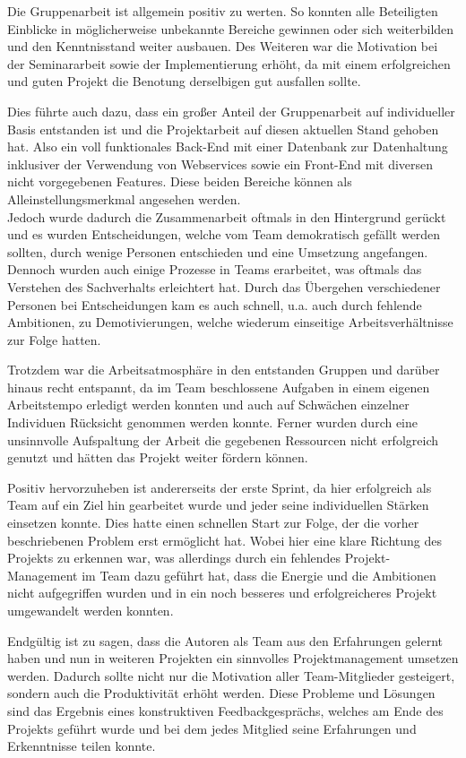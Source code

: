 Die Gruppenarbeit ist allgemein positiv zu werten. 
So konnten alle Beteiligten Einblicke in möglicherweise unbekannte Bereiche gewinnen oder sich weiterbilden und den Kenntnisstand weiter ausbauen.
Des Weiteren war die Motivation bei der Seminararbeit sowie der Implementierung erhöht, da mit einem erfolgreichen und guten Projekt die Benotung derselbigen gut ausfallen sollte.

Dies führte auch dazu, dass ein großer Anteil der Gruppenarbeit auf individueller Basis entstanden ist und die Projektarbeit auf diesen aktuellen Stand gehoben hat. Also ein voll funktionales Back-End mit einer Datenbank zur Datenhaltung inklusiver der Verwendung von Webservices sowie ein Front-End mit diversen nicht vorgegebenen Features. Diese beiden Bereiche können als Alleinstellungsmerkmal angesehen werden.\\
Jedoch wurde dadurch die Zusammenarbeit oftmals in den Hintergrund gerückt und es wurden Entscheidungen, welche vom Team demokratisch gefällt werden sollten, durch wenige Personen entschieden und eine Umsetzung angefangen. Dennoch wurden auch einige Prozesse in Teams erarbeitet, was oftmals das Verstehen des Sachverhalts erleichtert hat.
Durch das Übergehen verschiedener Personen bei Entscheidungen kam es auch schnell, u.a. auch durch fehlende Ambitionen, zu Demotivierungen, welche wiederum einseitige Arbeitsverhältnisse zur Folge hatten.

Trotzdem war die Arbeitsatmosphäre in den entstanden Gruppen und darüber hinaus recht entspannt, da im Team beschlossene Aufgaben in einem eigenen Arbeitstempo erledigt werden konnten und auch auf Schwächen einzelner Individuen Rücksicht genommen werden konnte.
Ferner wurden durch eine unsinnvolle Aufspaltung der Arbeit die gegebenen Ressourcen nicht erfolgreich genutzt und hätten das Projekt weiter fördern können.

Positiv hervorzuheben ist andererseits der erste Sprint, da hier erfolgreich als Team auf ein Ziel hin gearbeitet wurde und jeder seine individuellen Stärken einsetzen konnte.
Dies hatte einen schnellen Start zur Folge, der die vorher beschriebenen Problem erst ermöglicht hat.
Wobei hier eine klare Richtung des Projekts zu erkennen war, was allerdings durch ein fehlendes Projekt-Management im Team dazu geführt hat, dass die Energie und die Ambitionen nicht aufgegriffen wurden und in ein noch besseres und erfolgreicheres Projekt umgewandelt werden konnten.

Endgültig ist zu sagen, dass die Autoren als Team aus den Erfahrungen gelernt haben und nun in weiteren Projekten ein sinnvolles Projektmanagement umsetzen werden.
Dadurch sollte nicht nur die Motivation aller Team-Mitglieder gesteigert, sondern auch die Produktivität erhöht werden.
Diese Probleme und Lösungen sind das Ergebnis eines konstruktiven Feedbackgesprächs, welches am Ende des Projekts geführt wurde und bei dem jedes Mitglied seine Erfahrungen und Erkenntnisse teilen konnte.
